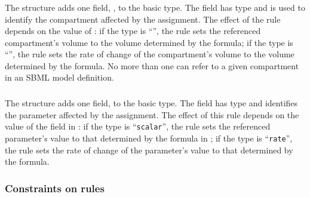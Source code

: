 \documentclass[10pt]{cekarticle}
\newcommand{\changed}[1]{\textcolor{BrickRed}{#1}}
\newenvironment{blockChanged}{\color{BrickRed}}{}
\begin{document}
\subsubsection{}

The  structure adds one field, ,
to the basic  type.  The field 
has type  and is used to identify the compartment affected by
the assignment.  The effect of the rule depends on the value of
: if the type is ``'', the rule sets the
referenced compartment's volume to the volume determined by the formula; if
the type is ``'', the rule sets the rate of change of the
compartment's volume to the volume determined by the formula.
\changed{No more than one  can refer to a
given compartment in an SBML model definition.}


\subsubsection{}
\label{sec:parameterrule}

\begin{blockChanged}
  The  structure adds one field,  to the
  basic  type.  The  field has type
   and identifies the parameter affected by the assignment.
  The effect of this rule depends on the value of the  field
  in : if the type is ``\texttt{scalar}'', the rule
  sets the referenced parameter's value to that determined by the formula
  in ; if the type is ``\texttt{rate}'', the rule sets the
  rate of change of the parameter's value to that determined by the
  formula.
\end{blockChanged}



\subsubsection{Constraints on rules}
\label{sec:ruleconstraints}
\end{document}
